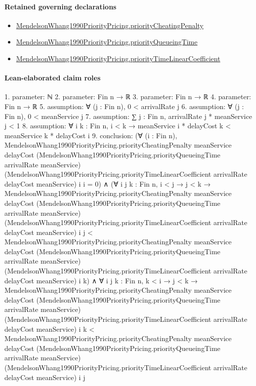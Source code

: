 \documentclass[10pt]{article}
\begin{document}
\paragraph{Retained governing declarations}
\begin{itemize}\raggedright
\item \hyperlink{paper-prerequisite-54c5682d350b5d3d}{Mendelson\allowbreak{}Whang1990\allowbreak{}Priority\allowbreak{}Pricing.\allowbreak{}priority\allowbreak{}Cheating\allowbreak{}Penalty}
\item \hyperlink{paper-prerequisite-49957d909aa24bc5}{Mendelson\allowbreak{}Whang1990\allowbreak{}Priority\allowbreak{}Pricing.\allowbreak{}priority\allowbreak{}Queueing\allowbreak{}Time}
\item \hyperlink{paper-prerequisite-ae05cc1b41c33470}{Mendelson\allowbreak{}Whang1990\allowbreak{}Priority\allowbreak{}Pricing.\allowbreak{}priority\allowbreak{}Time\allowbreak{}Linear\allowbreak{}Coefficient}
\end{itemize}
\paragraph{Lean-elaborated claim roles}\begin{ReviewVerbatim}
1. parameter: ℕ
2. parameter: Fin n → ℝ
3. parameter: Fin n → ℝ
4. parameter: Fin n → ℝ
5. assumption: ∀ (j : Fin n), 0 < arrivalRate j
6. assumption: ∀ (j : Fin n), 0 < meanService j
7. assumption: ∑ j : Fin n, arrivalRate j * meanService j < 1
8. assumption: ∀ {i k : Fin n}, i < k → meanService i * delayCost k < meanService k * delayCost i
9. conclusion: (∀ (i : Fin n),
    MendelsonWhang1990PriorityPricing.priorityCheatingPenalty meanService delayCost
        (MendelsonWhang1990PriorityPricing.priorityQueueingTime arrivalRate meanService)
        (MendelsonWhang1990PriorityPricing.priorityTimeLinearCoefficient arrivalRate delayCost meanService) i i =
      0) ∧
  (∀ {i j k : Fin n},
      i < j →
        j < k →
          MendelsonWhang1990PriorityPricing.priorityCheatingPenalty meanService delayCost
              (MendelsonWhang1990PriorityPricing.priorityQueueingTime arrivalRate meanService)
              (MendelsonWhang1990PriorityPricing.priorityTimeLinearCoefficient arrivalRate delayCost meanService) i j <
            MendelsonWhang1990PriorityPricing.priorityCheatingPenalty meanService delayCost
              (MendelsonWhang1990PriorityPricing.priorityQueueingTime arrivalRate meanService)
              (MendelsonWhang1990PriorityPricing.priorityTimeLinearCoefficient arrivalRate delayCost meanService) i k) ∧
    ∀ {i j k : Fin n},
      k < i →
        j < k →
          MendelsonWhang1990PriorityPricing.priorityCheatingPenalty meanService delayCost
              (MendelsonWhang1990PriorityPricing.priorityQueueingTime arrivalRate meanService)
              (MendelsonWhang1990PriorityPricing.priorityTimeLinearCoefficient arrivalRate delayCost meanService) i k <
            MendelsonWhang1990PriorityPricing.priorityCheatingPenalty meanService delayCost
              (MendelsonWhang1990PriorityPricing.priorityQueueingTime arrivalRate meanService)
              (MendelsonWhang1990PriorityPricing.priorityTimeLinearCoefficient arrivalRate delayCost meanService) i j
\end{ReviewVerbatim}
\end{document}

